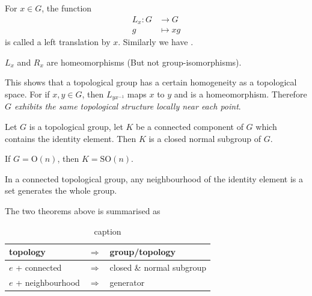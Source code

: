 \documentclass{article}
\begin{document}
\begin{defi}
    For $x\in G$, the function
    \begin{align}
        L_x: G &\to G \\
          g &\mapsto xg
    \end{align}
    is called a left translation by $x$. Similarly we have
    .
\end{defi}
\begin{fact}
    $L_x$ and $R_x$ are homeomorphisms (But not group-isomorphisms).
\end{fact}
\begin{remark}
    This shows that a topological group has a certain homogeneity as a
    topological space. For if $x,y\in G$, then $L_{yx^{-1}}$ maps $x$
    to $y$ and is a homeomorphism. Therefore \textit{$G$ exhibits the
    same topological structure locally near each point}.
\end{remark}
\begin{thm}
    Let $G$ is a topological group, let $K$ be a connected component of $G$
    which contains the identity element. Then $K$ is a closed normal
    subgroup of $G$.
\end{thm}
\begin{fact}
    If $G=\mathrm{O}(n)$, then $K=\mathrm{SO}(n)$.
\end{fact}
\begin{thm}
    In a connected topological group, any neighbourhood of the
    identity element is a set generates the whole group.
\end{thm}
The two theorems above is summarised as

\begin{table}[H]
    \centering
    \caption{caption}
    \begin{tabu}{l c l}
        topology            & $\Rightarrow$ & group/topology \\
        \hline
        $e$ + connected     & $\Rightarrow$ & closed \& normal subgroup \\
        $e$ + neighbourhood & $\Rightarrow$ & generator \\
        \bottomrule
    \end{tabu}
\end{table}
\end{document}
